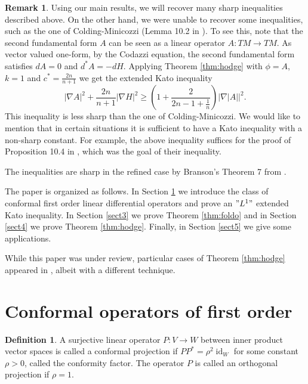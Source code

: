 \documentclass[12pt]{amsart} %
\theoremstyle{definition}
\newtheorem{definition}[theorem]{Definition}
\newtheorem{remark}[theorem]{Remark}
\numberwithin{equation}{section}
\DeclareMathOperator{\id}{id}
\newcommand{\ra}{\rightarrow}
\begin{document}
\begin{remark}
Using our main results, we will recover many sharp inequalities described above. On the other hand, we were unable to recover some inequalities, such as the one of Colding-Minicozzi (Lemma 10.2 in \cite{CM2012}). To see this, note that the second fundamental form $A$ can be seen as a linear operator $A:TM \to TM$. As vector valued one-form, by the Codazzi equation, the second fundamental form satisfies $dA = 0$ and $d^{*}A=-dH$. Applying Theorem \ref{thm:hodge} with $\phi = A$, $k=1$ and $c^{*}=\frac{2n}{n+1}$ we get the extended Kato inequality
$$\left|\nabla A\right|^{2}+\frac{2n}{n+1}\left| \nabla H\right|^{2}\geq\left(1+\frac{2}{2n-1+\frac{1}{n}}\right)\left|\nabla\left|A\right|\right|^{2}.$$
This inequality is less sharp than the one of Colding-Minicozzi. We would  like to mention that in certain situations it is sufficient to have a Kato inequality with a non-sharp constant. For example, the above inequality suffices for the proof of Proposition 10.4 in \cite{CM2012}, which was the goal of their inequality.

The inequalities are sharp in the refined case  by Branson's Theorem 7 from \cite{B2000}.
\end{remark}


The paper is organized as follows. In Section \ref{sect2} we introduce the class of conformal first order linear differential operators and prove an $"L^1"$ extended Kato inequality.  In Section \ref{sect3} we prove Theorem \ref{thm:foldo} and in Section \ref{sect4} we prove Theorem \ref{thm:hodge}. Finally, in Section \ref{sect5} we give some applications.

While this paper was under review, particular cases of Theorem \ref{thm:hodge} appeared in \cite{CS}, albeit with a different  technique.










\section{Conformal operators of first order}\label{sect2}
\begin{definition}\label{confdef} A surjective linear operator $P:V\ra W$ between inner product vector spaces is called a conformal projection if $PP^ *=\rho^ 2\id_{W}$ for some  constant $\rho>0$, called the  conformity factor. The operator $P$ is called an orthogonal projection if $\rho=1$.
\end{definition}
\end{document}
